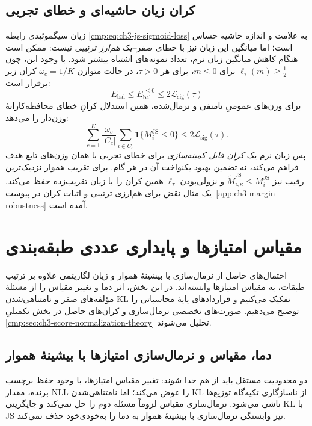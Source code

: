 \subsection{کران زیان حاشیه‌ای و خطای تجربی}
زیان سیگموئیدی رابطه
\eqref{cmp:eq:ch3-js-sigmoid-loss}
به علامت و اندازه حاشیه حساس است؛
اما میانگین این زیان نیز با خطای صفر--یک
\emph{هم‌ارز ترتیبی} نیست:
ممکن است هنگام کاهش میانگین زیان نرم،
تعداد نمونه‌های اشتباه بیشتر شود.
با وجود این، چون
$\ell_\tau(m)\ge\tfrac12$ برای $m\le0$،
برای هر $\tau>0$، در حالت متوازن $\omega_c=1/K$ کران زیر برقرار است:
\begin{equation}\label{cmp:eq:ch3-margin-sigmoid-error-bound}
\boxed{
E_{\mathrm{bal}}
\le E_{\mathrm{bal}}^{\,\le0}
\le 2\mathcal L_{\mathrm{sig}}(\tau)
}
\end{equation}
برای وزن‌های عمومیِ نامنفی و نرمال‌شده، همین استدلال کرانِ خطای محافظه‌کارانهٔ وزن‌دار را می‌دهد:
\[
\sum_{c=1}^{K}\frac{\omega_c}{|C_c|}
\sum_{i\in C_c}\mathbf1\{M_i^{\mathrm{JS}}\le0\}
\le 2\mathcal L_{\mathrm{sig}}(\tau).
\]
پس زیان نرم یک \emph{کران قابل کمینه‌سازی}
برای خطای تجربی با همان وزن‌های تابع هدف فراهم می‌کند، نه تضمین
بهبود یکنواخت آن در هر گام.
برای تقریب هموار نزدیک‌ترین رقیب نیز
$\widetilde M_{i,\kappa}^{\mathrm{JS}}\le M_i^{\mathrm{JS}}$
و نزولی‌بودن $\ell_\tau$
همین کران را با زیان تقریب‌زده حفظ می‌کند.
یک مثال نقض برای هم‌ارزی ترتیبی
و اثبات کران در پیوست~\ref{app:ch3-margin-robustness}
آمده است.


\section{مقیاس امتیازها و پایداری عددی طبقه‌بندی}
\label{cmp:sec:ch3-score-normalization-analysis}
احتمال‌های حاصل از نرمال‌سازی با بیشینهٔ هموار و زیان لگاریتمی علاوه بر ترتیب
طبقات، به مقیاس امتیازها وابسته‌اند. در این بخش،
اثر دما و تغییر مقیاس را از مسئلهٔ مؤلفه‌های صفر
و نامتناهی‌شدن KL تفکیک می‌کنیم و قراردادهای
پایهٔ محاسباتی را توضیح می‌دهیم.
صورت‌های تخصصی نرمال‌سازی و کران‌های حاصل
در بخش تکمیلیِ
\ref{cmp:sec:ch3-score-normalization-theory}
تحلیل می‌شوند.

\subsection{دما، مقیاس و نرمال‌سازی امتیازها با بیشینهٔ هموار}
\label{cmp:subsec:ch3-NLL-scaling}

دو محدودیت مستقل باید از هم جدا شوند:
تغییر مقیاس امتیازها، با وجود حفظ برچسب برنده،
مقدار NLL را عوض می‌کند؛ اما نامتناهی‌شدن KL
از ناسازگاری تکیه‌گاه توزیع‌ها ناشی می‌شود.
نرمال‌سازی مقیاس لزوماً مسئله دوم را حل نمی‌کند
و جایگزینی KL با JS نیز وابستگی نرمال‌سازی با بیشینهٔ هموار
به دما را به‌خودی‌خود حذف نمی‌کند.

